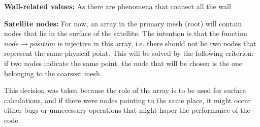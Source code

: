 \documentclass[reprint,aps]{revtex4-1}
\begin{document}
\textbf{Wall-related values:} As there are phenomena that connect all the wall

\textbf{Satellite nodes: } For now, an array in the primary mesh (root) will contain nodes that lie in the surface of the satellite. The intention is that the function $node \rightarrow position$ is injective in this array, i.e. there should not be two nodes that represent the same physical point. This will be solved by the following criterion: if two nodes indicate the same point, the node that will be chosen is the one belonging to the coarsest mesh.

This decision was taken because the role of the array is to be used for surface calculations, and if there were nodes pointing to the same place, it might occur either bugs or unnecessary operations that might haper the performance of the code.
\end{document}
